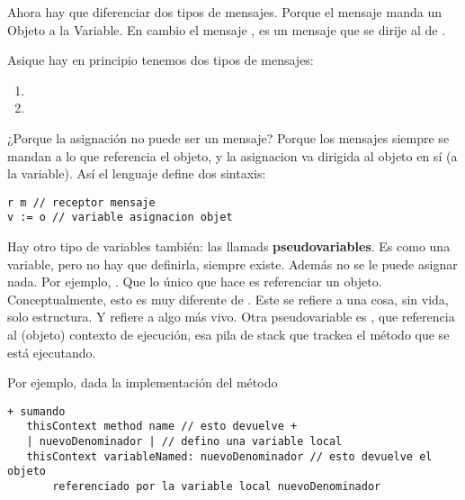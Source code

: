 Ahora hay que diferenciar dos tipos de mensajes. Porque el mensaje \code{:=} manda un Objeto a la Variable. En cambio el mensaje , es un mensaje que se dirije al  de . 

Asique hay en principio tenemos dos tipos de mensajes: 
\begin{enumerate}
 \item {}
 \item {}
\end{enumerate}

¿Porque la asignación no puede ser un mensaje? 
Porque los mensajes siempre se mandan a lo que referencia el objeto, y la asignacion va dirigida al objeto en sí (a la variable). 
Así el lenguaje define dos sintaxis: 
\begin{verbatim}
r m // receptor mensaje
v := o // variable asignacion objet
\end{verbatim}

Hay otro tipo de variables también: las llamads \textbf{pseudovariables}. Es como una variable, pero no hay que definirla, siempre existe. Además no se le puede asignar nada. Por ejemplo, . Que lo único que hace es referenciar un objeto. 
Conceptualmente, esto es muy diferente de . Este se refiere a una cosa, sin vida, solo estructura. Y  refiere a algo más vivo. 
Otra pseudovariable es , que referencia al (objeto) contexto de ejecución, esa pila de stack que trackea el método que se está ejecutando.  

Por ejemplo, dada la implementación del método
\begin{verbatim}
+ sumando
   thisContext method name // esto devuelve +
   | nuevoDenominador | // defino una variable local
   thisContext variableNamed: nuevoDenominador // esto devuelve el objeto 
       referenciado por la variable local nuevoDenominador
\end{verbatim}

